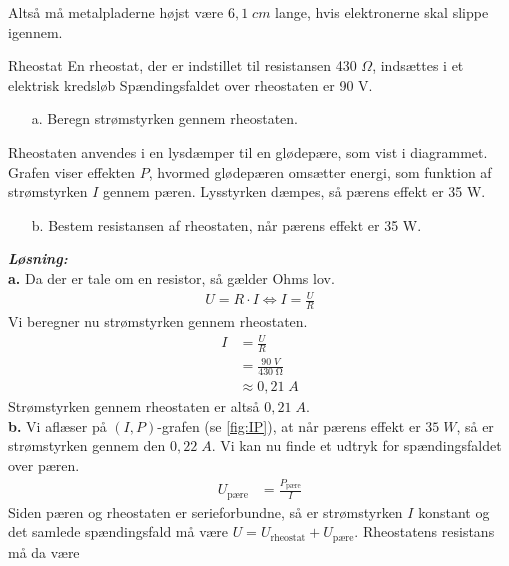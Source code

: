 \documentclass{report}
\newcommand{\sol}{\setlength{\parindent}{0cm}\textbf{\textit{Løsning:}}\setlength{\parindent}{1cm}}
\begin{document}
Altså må metalpladerne højst være $6,1 \;\unit{cm} $ lange, hvis elektronerne skal slippe igennem. 
\begin{question}{Rheostat}{}
  En rheostat, der er indstillet til resistansen 430 $\Omega$, indsættes i et elektrisk kredsløb
Spændingsfaldet over rheostaten er 90 V.
\begin{itemize}
  \item[a.] Beregn strømstyrken gennem rheostaten.
\end{itemize}
Rheostaten anvendes i en lysdæmper til en glødepære, som vist i diagrammet.
Grafen viser effekten $P$, hvormed glødepæren omsætter energi, som funktion af strømstyrken $I$
gennem pæren.
Lysstyrken dæmpes, så pærens effekt er 35 W.
\begin{itemize}
  \item[b.] Bestem resistansen af rheostaten, når pærens effekt er 35 W.
\end{itemize}
\end{question}
\sol \\
\textbf{a.}
Da der er tale om en resistor, så gælder Ohms lov.
\begin{equation*}
\begin{split}
  U=R \cdot I \iff I=\frac{U}{R}
\end{split}
\end{equation*}
Vi beregner nu strømstyrken gennem rheostaten.
\begin{equation*}
\begin{split}
  I&=\frac{U}{R}\\
  &=\frac{90 \;\unit{V} }{430 \;\unit{\ohm} }\\
  &\approx 0,21 \;\unit{A} 
\end{split}
\end{equation*}
Strømstyrken gennem rheostaten er altså $0,21 \;\unit{A} $.\\[1ex]
\textbf{b.}
Vi aflæser på $(I,P)$-grafen (se \cref{fig:IP}), at når pærens effekt er $35 \;\unit{W} $, så er strømstyrken gennem den $0,22 \;\unit{A} $.
Vi kan nu finde et udtryk for spændingsfaldet over pæren.
\begin{equation*}
\begin{split}
  U _{\text{pære} }&=\frac{P _{\text{pære} }}{I}
\end{split}
\end{equation*}
Siden pæren og rheostaten er serieforbundne, så er strømstyrken $I$ konstant og det samlede spændingsfald må være $U=U _{\text{rheostat} } + U _{\text{pære} }$.
Rheostatens resistans må da være
\end{document}
